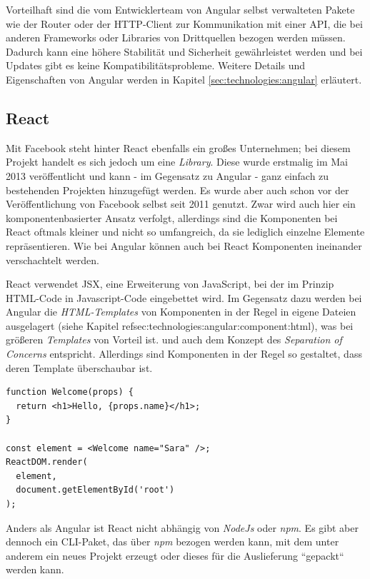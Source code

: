Vorteilhaft sind die vom Entwicklerteam von Angular selbst verwalteten Pakete wie der Router oder der \acs{HTTP}-Client zur Kommunikation mit einer \acs{API}, die bei anderen Frameworks oder Libraries von Drittquellen bezogen werden müssen. Dadurch kann eine höhere Stabilität und Sicherheit gewährleistet werden und bei Updates gibt es keine Kompatibilitätsprobleme. Weitere Details und Eigenschaften von Angular werden in Kapitel \ref{sec:technologies:angular} erläutert.

\subsection{React}
\label{sec:technologies:frameworks:react}

Mit Facebook steht hinter React ebenfalls ein großes Unternehmen; bei diesem Projekt handelt es sich jedoch um eine \textit{Library}. Diese wurde erstmalig im Mai 2013 veröffentlicht und kann - im Gegensatz zu Angular - ganz einfach zu bestehenden Projekten hinzugefügt werden. Es wurde aber auch schon vor der Veröffentlichung von Facebook selbst seit 2011 genutzt. Zwar wird auch hier ein komponentenbasierter Ansatz verfolgt, allerdings sind die Komponenten bei React oftmals kleiner und nicht so umfangreich, da sie lediglich einzelne Elemente repräsentieren. Wie bei Angular können auch bei React Komponenten ineinander verschachtelt werden.

React verwendet \acf{JSX}, eine Erweiterung von JavaScript, bei der im Prinzip HTML-Code in Javascript-Code eingebettet wird\cite{ReactJSX}. Im Gegensatz dazu werden bei Angular die \textit{HTML-Templates} von Komponenten in der Regel in eigene Dateien ausgelagert (siehe Kapitel ref{sec:technologies:angular:component:html}), was bei größeren \textit{Templates} von Vorteil ist.
und auch dem Konzept des \textit{Separation of Concerns} entspricht. Allerdings sind Komponenten in der Regel so gestaltet, dass deren Template überschaubar ist.
\begin{lstlisting}[float, floatplacement=h, style=htmlcssjs, caption={Code-Beispiel für React mit einem \textit{Functional Component}}, label={React}]
function Welcome(props) {
  return <h1>Hello, {props.name}</h1>;
}

const element = <Welcome name="Sara" />;
ReactDOM.render(
  element,
  document.getElementById('root')
);
\end{lstlisting}
Anders als Angular ist React nicht abhängig von \textit{NodeJs} oder \textit{npm}. Es gibt aber dennoch ein \acs{CLI}-Paket, das über \textit{npm} bezogen werden kann, mit dem unter anderem ein neues Projekt erzeugt oder dieses für die Auslieferung ``gepackt`` werden kann\cite{ReactCli}.

